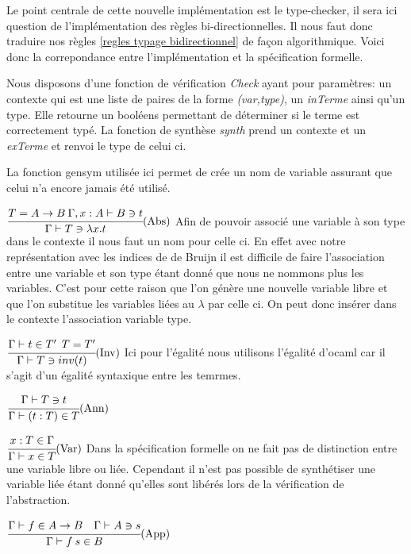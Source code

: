 \documentclass {article}
\newcommand{\codefrom}[3]
           {}
\theoremstyle{definition}
\theoremstyle{remark}
\begin{document}
Le point centrale de cette nouvelle implémentation est le type-checker, 
il sera ici question de l'implémentation des règles bi-directionnelles.
Il nous faut donc traduire nos règles \ref{regles typage bidirectionnel} 
de façon algorithmique. Voici donc la correpondance entre l'implémentation et la spécification formelle.

Nous disposons d'une fonction de vérification \emph{Check} ayant pour 
paramètres: un contexte qui est une liste de paires de la forme \emph{(var,type)},
un \emph{inTerme} ainsi qu'un type. Elle retourne un booléens permettant de déterminer
si le terme est correctement typé.
La fonction de synthèse \emph{synth} prend un contexte et un \emph{exTerme} 
et renvoi le type de celui ci.

La fonction gensym utilisée ici permet de crée un nom de variable assurant que celui n'a encore jamais
été utilisé. 

\label{check}

\codefrom{typed}{lambda}{check_abs}
$\cfrac{T = A \rightarrow B \: \Gamma, x:A \vdash B \ni t}
         {\Gamma \vdash T \ni \lambda x. t}\mbox{(Abs)}$
Afin de pouvoir associé une variable à son type dans le contexte il nous faut un nom pour celle ci.
En effet avec notre représentation avec les indices de de Bruijn il est difficile de faire l'association entre 
une variable et son type étant donné que nous ne nommons plus les variables.
C'est pour cette raison que l'on génère une nouvelle variable libre et que l'on substitue les variables liées 
au $\lambda$ par celle ci. On peut donc insérer dans le contexte l'association variable type.
  
\codefrom{typed}{lambda}{check_inv}
$\cfrac{\Gamma \vdash t \in T' \:\: T=T'}
         {\Gamma\vdash T \ni inv(t)}\mbox{(Inv)}$
Ici pour l'égalité nous utilisons l'égalité d'ocaml car il s'agit d'un égalité syntaxique entre les temrmes.


\codefrom{typed}{lambda}{synth_ann}
$\cfrac{\Gamma\vdash T \ni t}
         {\Gamma\vdash (t:T) \in T}\mbox{(Ann)}$

\codefrom{typed}{lambda}{synth_var}
$\cfrac{x:T \in \Gamma}
         {\Gamma \vdash x \in T }\mbox{(Var)}$
Dans la spécification formelle on ne fait pas de distinction entre une variable libre ou liée.
Cependant il n'est pas possible de synthétiser une variable liée étant donné qu'elles sont libérés lors
de la vérification de l'abstraction.

\codefrom{typed}{lambda}{synth_appl}
$\cfrac{\Gamma \vdash f \in A\rightarrow B \quad \Gamma\vdash A \ni s }
         {\Gamma\vdash f\:s\in B}\mbox{(App)}$
\end{document}
